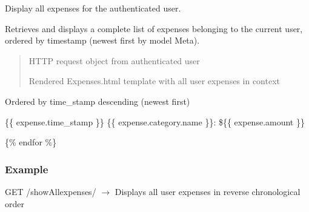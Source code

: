 \documentclass[letterpaper,10pt,english]{sphinxmanual}
\begin{document}
\begin{fulllineitems}
\label{\detokenize{expensesApp:expensesApp.views.displayAllexpenses}}
\pysigstartsignatures
\pysiglinewithargsret
{}
{}
{}
\pysigstopsignatures
\sphinxAtStartPar
Display all expenses for the authenticated user.

\sphinxAtStartPar
Retrieves and displays a complete list of expenses belonging to
the current user, ordered by timestamp (newest first by model Meta).
\begin{quote}\begin{description}
\sphinxAtStartPar
{} \textendash{} HTTP request object from authenticated user

\sphinxAtStartPar
Rendered Expenses.html template with all user expenses in context

\end{description}\end{quote}
\begin{description}
\begin{description}
\sphinxAtStartPar
Ordered by time\_stamp descending (newest first)

\end{description}

\begin{description}
\sphinxAtStartPar
\{\{ expense.time\_stamp \}\} \sphinxhyphen{} \{\{ expense.category.name \}\}: \$\{\{ expense.amount \}\}

\end{description}

\sphinxAtStartPar
\{\% endfor \%\}

\end{description}
\subsubsection*{Example}

\sphinxAtStartPar
GET /showAllexpenses/ \(\rightarrow\) Displays all user expenses in reverse chronological order

\end{fulllineitems}
\end{document}
